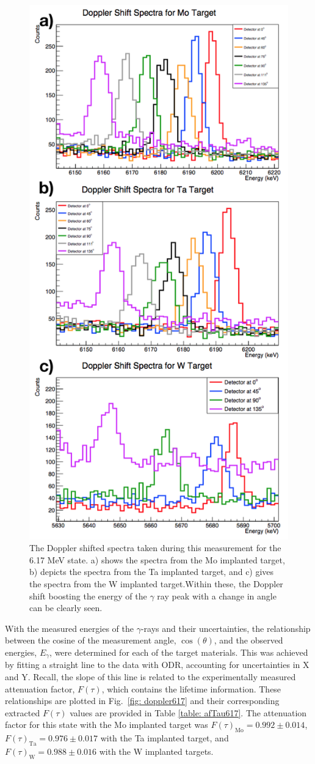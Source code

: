 \begin{figure}
\centering
\includegraphics[width=0.6\linewidth]{figures/shifts617.png}
\caption{The Doppler shifted spectra taken during this measurement for the 6.17 MeV state. a) shows the spectra from the Mo implanted target, b) depicts the spectra from the Ta implanted target, and c) gives the spectra from the W implanted target.Within these, the Doppler shift boosting the energy of the $\gamma$ ray peak  with a change in angle can be clearly seen. }
\label{fig: shift617}
\end{figure}


With the measured energies of the $\gamma$-rays and their uncertainties, the relationship between the cosine of the measurement angle, $\cos(\theta)$, and the observed energies, $E_{\gamma}$, were determined for each of the target materials. This was achieved by fitting a straight line to the data with ODR, accounting for uncertainties in X and Y. Recall, the slope of this line is related to the experimentally measured attenuation factor, $F(\tau)$, which contains the lifetime information. These relationships are plotted in Fig.\ \ref{fig: doppler617} and their corresponding extracted $F(\tau)$ values are provided in Table \ref{table: afTau617}. The attenuation factor for this state with the Mo implanted target was $F(\tau)_{\text{Mo}} = 0.992 \pm 0.014$, $F(\tau)_{\text{Ta}} = 0.976 \pm 0.017$ with the Ta implanted target, and $F(\tau)_{\text{W}} = 0.988 \pm 0.016$ with the W implanted targets.


